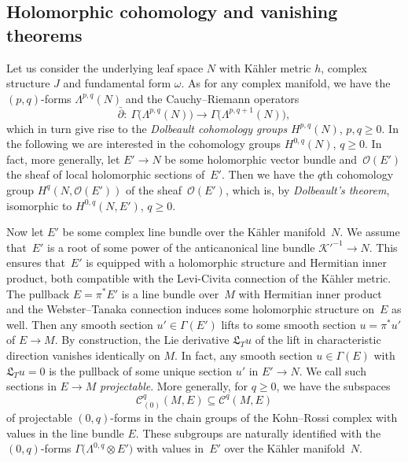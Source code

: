 \documentclass[10pt,a4paper]{amsart}
\numberwithin{equation}{section}
\begin{document}
\subsection{Holomorphic cohomology and vanishing theorems}
Let us consider the underlying leaf space $N$ with K\"ahler metric $h$, complex structure $J$ and fundamental form $\omega$.
As for any complex manifold, we have the $(p,q)$-forms $\Lambda^{p,q}(N)$ and the Cauchy--Riemann operators
\[
\bar{\partial}\colon \ \Gamma\big(\Lambda^{p,q}(N)\big)\to \Gamma\big(\Lambda^{p,q+1}(N)\big),
\]
which in turn give rise to the {\em Dolbeault cohomology groups} $H^{p,q}(N)$, $p,q\geq 0$.
In the following we are interested in the cohomology groups $H^{0,q}(N)$, $q\geq 0$.
In fact, more generally, let $E'\to N$ be some holomorphic vector bundle and~$\mathcal{O}(E')$ the sheaf of local holomorphic sections
of~$E'$. Then we have the $q$th cohomology group $H^q(N,\mathcal{O}(E'))$ of the sheaf~$\mathcal{O}(E')$, which is, by
{\em Dolbeault's theorem}, isomorphic to $H^{0,q}(N,E')$, $q\geq 0$.

Now let $E'$ be some complex line bundle over the K\"ahler manifold~$N$. We assume that~$E'$ is a root of some power of
the anticanonical line bundle $\mathcal{K}'^{-1}\to N$. This ensures that~$E'$ is equipped with a holomorphic structure and Hermitian inner product,
both compatible with the Levi-Civita connection of the K\"ahler metric.
The pullback $E=\pi^*E'$ is a line bundle over~$M$ with Hermitian inner product and the Webster--Tanaka connection induces some holomorphic structure on~$E$
as well.
Then any smooth section $u'\in\Gamma(E')$ lifts to some smooth section $u=\pi^*u'$ of $E\to M$. By construction, the Lie derivative
$\mathfrak{L}_Tu$ of the lift in characteristic direction vanishes identically on $M$. In fact, any smooth section $u\in\Gamma(E)$ with $\mathfrak{L}_Tu=0$ is the pullback of some unique section
$u'$ in $E'\to N$. We call such sections in $E\to M$ {\em projectable}.
More generally, for $q\geq 0$, we have the subspaces \[\mathcal{C}_{(0)}^q(M,E) \subseteq \mathcal{C}^q(M,E)\] of projectable $(0,q)$-forms in the chain groups
of the Kohn--Rossi complex with values in the line bundle $E$. These subgroups are
naturally identified with the $(0,q)$-forms
$\Gamma\big(\Lambda^{0,q}\otimes E'\big)$ with values in~$E'$ over the K\"ahler manifold~$N$.
\end{document}
